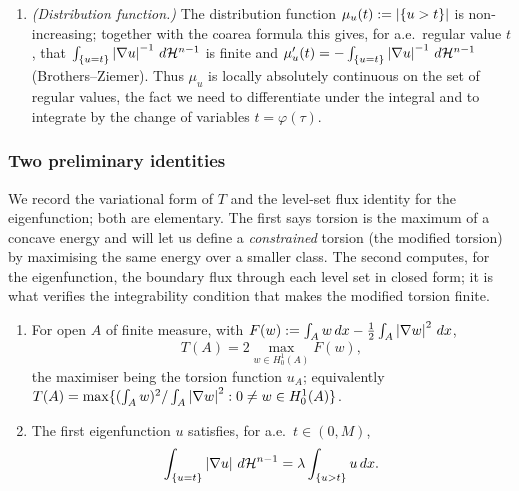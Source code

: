 \begin{enumerate}[label=\textup{(R\arabic*)}]
\item\label{R:absc} \emph{(Distribution function.)} The distribution
function $\mu_u(t):=\left|\{u>t\}\right|$ is non-increasing; together with the
coarea formula this gives, for a.e.\ regular value $t$, that
$\int_{\{u=t\}}\left|\nabla u\right|^{-1}\,d\mathcal H^{n-1}$ is finite and
$\mu_u'(t)=-\int_{\{u=t\}}\left|\nabla u\right|^{-1}\,d\mathcal H^{n-1}$ (Brothers--Ziemer). Thus
$\mu_u$ is locally absolutely continuous on the set of regular values, the
fact we need to differentiate under the integral and to integrate by the
change of variables $t=\varphi(\tau)$.
\end{enumerate}

\subsubsection*{Two preliminary identities}

We record the variational form of $T$ and the level-set flux identity for
the eigenfunction; both are elementary. The first says torsion is the
maximum of a concave energy and will let us define a \emph{constrained}
torsion (the modified torsion) by maximising the same energy over a smaller
class. The second computes, for the eigenfunction, the boundary flux
through each level set in closed form; it is what verifies the integrability
condition that makes the modified torsion finite.

\begin{lemma}\label{lem:prelim}
\leavevmode
\begin{enumerate}[label=\textup{(\roman*)}]
\item\label{it:Fvar} For open $A$ of finite measure, with
$F(w):=\int_A w\,dx-\tfrac12\int_A\left|\nabla w\right|^2\,dx$,
\begin{equation}\label{eq:Tvar}
  T(A)=2\max_{w\in H^1_0(A)}F(w),
\end{equation}
the maximiser being the torsion function $u_A$; equivalently
$T(A)=\max\{(\int_A w)^2/\int_A\left|\nabla w\right|^2:0\ne w\in H^1_0(A)\}$.
\item\label{it:flux} The first eigenfunction $u$ satisfies, for a.e.\
$t\in(0,M)$,
\begin{equation}\label{eq:flux}
  \int_{\{u=t\}}\left|\nabla u\right|\,d\mathcal H^{n-1}=\lambda\int_{\{u>t\}}u\,dx .
\end{equation}
\end{enumerate}
\end{lemma}


